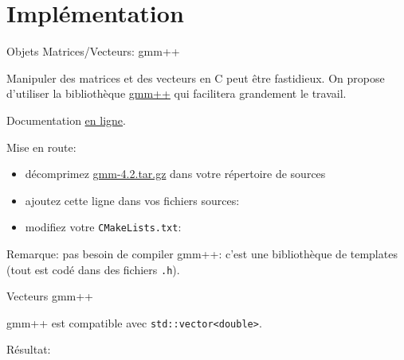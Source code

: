 \documentclass[
mode=present,    %
paper=a4paper,   %
orient=landscape,
display=slides,   %
size=10pt,     %
style=romain   %
]{powerdot}
\begin{document}
\section{Implémentation}

\begin{slide}[method=file, toc=gmm++]{Objets Matrices/Vecteurs: gmm++}   %

Manipuler des matrices et des vecteurs en C peut être fastidieux. On propose d'utiliser la bibliothèque
\href{http://download.gna.org/getfem/html/homepage/gmm/}{gmm++} qui facilitera grandement le travail.

\bigskip

Documentation \href{http://download.gna.org/getfem/html/homepage/userdoc/index.html}{en ligne}.

\bigskip

Mise en route:
\begin{itemize}
\item décomprimez \href{http://download.gna.org/getfem/stable/gmm-4.2.tar.gz}{gmm-4.2.tar.gz} dans votre répertoire de sources
\item ajoutez cette ligne dans vos fichiers sources:

\item modifiez votre {\tt CMakeLists.txt}:

\end{itemize}

\bigskip
Remarque: pas besoin de compiler gmm++: c'est une bibliothèque de templates (tout est codé dans des fichiers {\tt .h}).


\end{slide}

\begin{slide}[method=file, toc=Vecteurs]{Vecteurs gmm++}  %

gmm++ est compatible avec \verb$std::vector<double>$.


Résultat:


\end{slide}
\end{document}

